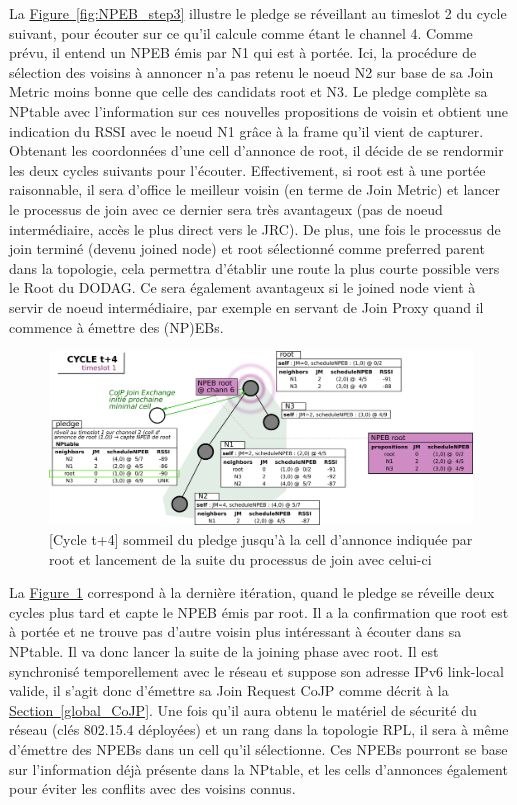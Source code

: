 \documentclass[]{report}
\newcommand{\wordlink}[2]{\hyperref[#2]{#1~\ref{#2}}}
\begin{document}
La \wordlink{Figure}{fig:NPEB_step3} illustre le pledge se réveillant au timeslot 2 du cycle suivant, pour écouter sur ce qu'il calcule comme étant le channel 4. Comme prévu, il entend un NPEB émis par N1 qui est à portée. Ici, la procédure de sélection des voisins à annoncer n'a pas retenu le noeud N2 sur base de sa Join Metric moins bonne que celle des candidats root et N3. Le pledge complète sa NPtable avec l'information sur ces nouvelles propositions de voisin et obtient une indication du RSSI avec le noeud N1 grâce à la frame qu'il vient de capturer. Obtenant les coordonnées d'une cell d'annonce de root, il décide de se rendormir les deux cycles suivants pour l'écouter. Effectivement, si root est à une portée raisonnable, il sera d'office le meilleur voisin (en terme de Join Metric) et lancer le processus de join avec ce dernier sera très avantageux (pas de noeud intermédiaire, accès le plus direct vers le JRC). De plus, une fois le processus de join terminé (devenu joined node) et root sélectionné comme preferred parent dans la topologie, cela permettra d'établir une route la plus courte possible vers le Root du DODAG. Ce sera également avantageux si le joined node vient à servir de noeud intermédiaire, par exemple en servant de Join Proxy quand il commence à émettre des (NP)EBs.

\newpage

 \vspace{0.4cm}
	\begin{figure}[!h]
	\centering
	\includegraphics[width=\linewidth]{NPEB_step4}
	\caption{[Cycle t+4] sommeil du pledge jusqu'à la cell d'annonce indiquée par root et lancement de la suite du processus de join avec celui-ci}
	\label{fig:NPEB_step4}
	\end{figure}
\vspace{0.4cm}

La \wordlink{Figure}{fig:NPEB_step4} correspond à la dernière itération, quand le pledge se réveille deux cycles plus tard et capte le NPEB émis par root. Il a la confirmation que root est à portée et ne trouve pas d'autre voisin plus intéressant à écouter dans sa NPtable. Il va donc lancer la suite de la joining phase avec root. Il est synchronisé temporellement avec le réseau et suppose son adresse IPv6 link-local valide, il s'agit donc d'émettre sa Join Request CoJP comme décrit à la \wordlink{Section}{global_CoJP}. Une fois qu'il aura obtenu le matériel de sécurité du réseau (clés 802.15.4 déployées) et un rang dans la topologie RPL, il sera à même d'émettre des NPEBs dans un cell qu'il sélectionne. Ces NPEBs pourront se base sur l'information déjà présente dans la NPtable, et les cells d'annonces également pour éviter les conflits avec des voisins connus.\\
\end{document}
